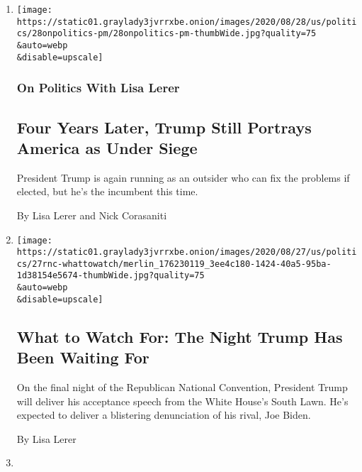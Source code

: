 \begin{enumerate}
\def\labelenumi{\arabic{enumi}.}
\item
  \href{/2020/08/28/us/politics/trump-rnc.html}{}

  \texttt{[image: https://static01.graylady3jvrrxbe.onion/images/2020/08/28/us/politics/28onpolitics-pm/28onpolitics-pm-thumbWide.jpg?quality=75\\\&auto=webp\\\&disable=upscale]}

  \hypertarget{on-politics-with-lisa-lerer}{%
  \subsubsection{On Politics With Lisa
  Lerer}\label{on-politics-with-lisa-lerer}}

  \hypertarget{four-years-later-trump-still-portrays-america-as-under-siege}{%
  \subsection{Four Years Later, Trump Still Portrays America as Under
  Siege}\label{four-years-later-trump-still-portrays-america-as-under-siege}}

  President Trump is again running as an outsider who can fix the
  problems if elected, but he's the incumbent this time.

  By Lisa Lerer and Nick Corasaniti
\item
  \href{/2020/08/27/us/politics/republican-national-convention-guide.html}{}

  \texttt{[image: https://static01.graylady3jvrrxbe.onion/images/2020/08/27/us/politics/27rnc-whattowatch/merlin\_176230119\_3ee4c180-1424-40a5-95ba-1d38154e5674-thumbWide.jpg?quality=75\\\&auto=webp\\\&disable=upscale]}

  \hypertarget{what-to-watch-for-the-night-trump-has-been-waiting-for}{%
  \subsection{What to Watch For: The Night Trump Has Been Waiting
  For}\label{what-to-watch-for-the-night-trump-has-been-waiting-for}}

  On the final night of the Republican National Convention, President
  Trump will deliver his acceptance speech from the White House's South
  Lawn. He's expected to deliver a blistering denunciation of his rival,
  Joe Biden.

  By Lisa Lerer
\item
  \href{/2020/08/27/us/politics/mike-pence-rnc-convention.html}{}


\end{enumerate}
